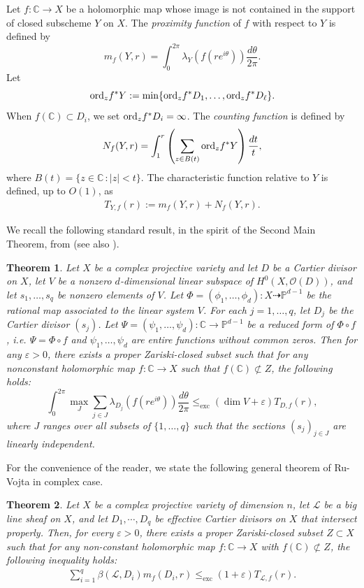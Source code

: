 \documentclass[10pt]{amsart}
\numberwithin{equation}{section}
\theoremstyle{plain}
\newtheorem{theorem}{Theorem}[section]
\theoremstyle{definition}
\begin{document}
Let $f:\mathbb{C}\to X$ be a holomorphic map whose image is not contained in the support of closed subscheme  $Y$ on $X$. 
 The {\it proximity function} of $f$ with respect to $Y$ is defined by $$m_f(Y,r)=\int_0^{2\pi}\lambda_Y(f (re^{i\theta}))\frac{d\theta}{2\pi}.$$
 Let 
$$
{\rm ord}_zf^*Y:=\min\{{\rm ord}_zf^*D_1,\hdots,{\rm ord}_zf^*D_{\ell}\}.
$$
When $f(\mathbb{C})\subset D_i$, we set ${\rm ord}_zf^*D_{i}=\infty$.
The  {\it counting function}   is defined  by
$$
N_f(Y,r) = \int_1^r \left(\sum_{z\in B(t)}{\rm ord}_zf^*Y \right) \frac{dt}{t},
$$
where $B(t)=\{z\in \mathbb C\, : |z|<t\}.$   
 The characteristic function relative to $Y$ is defined, up to $O(1)$, as 
\begin{align}\label{FMT}
T_{Y,f}(r):=m_f(Y,r)+N_f(Y,r).
\end{align}

 
 


We recall the following standard result, in the spirit of the Second Main Theorem, from \cite[Theorem 7.3]{RTW21} (see also \cite[Theorem A.7.1.1]{Rubook}).
\begin{theorem}
\label{gsmt2}
    Let $X$ be a complex projective variety and let $D$ be a Cartier divisor on $X$, let $V$ be a nonzero $d$-dimensional linear subspace of $H^0(X,\mathcal{O}(D))$, and let $s_1,\dots,s_q$ be nonzero elements of $V$. 
 Let $\Phi=(\phi_1,\hdots,\phi_{d}):X\dashrightarrow \mathbb{P}^{d-1}$ be the rational map associated to the linear system $V$. For each $j=1,\dots,q$, let $D_j$ be the Cartier divisor $(s_j)$. 
     Let $\Psi=(\psi_1,\hdots,\psi_{d}):\mathbb C\to   \mathbb{P}^{d-1}$ be a reduced form of $\Phi\circ f$, i.e.  $\Psi=\Phi\circ f$  and $\psi_1,\hdots,\psi_{d}$ are entire functions without common zeros. %
    Then for any $\varepsilon>0$, there exists a proper  Zariski-closed subset such that for any nonconstant holomorphic map $f:\mathbb{C}\to X$ such that  $f(\mathbb{C})\not\subset Z$, the following holds:
       $$\int_0^{2\pi} \max_J \sum_{j\in J} \lambda_{D_j}(f(re^{i\theta}))\frac{d\theta}{2\pi} \leq_{\operatorname{exc}} (\operatorname{dim}V+\varepsilon)T_{D,f}(r),$$ where $J$ ranges over all subsets of $\{1,\dots,q\}$ such that the sections $(s_j)_{j\in J}$ are linearly independent.
       \end{theorem}

For the convenience of the reader, we state the following general theorem of Ru-Vojta in complex case.
\begin{theorem}\label{generalRV}
 Let $X$ be a complex projective variety of dimension $n$,  let $\mathscr L$ be a big line sheaf on $X$, and let
 $D_1,\cdots,D_q$  be effective Cartier divisors on  $X$ that intersect properly.
 Then, for every $\varepsilon>0$,  there exists a proper  Zariski-closed subset $Z\subset X$ such that for any non-constant holomorphic map $f:\mathbb{C}\to X$ with  $f(\mathbb{C})\not\subset Z$,  the following  inequality  holds:
\begin{align}\label{mainineqRV}
 \sum_{i=1}^q \beta(\mathscr L, D_i)m_f(D_i,r)
 \leq_{\operatorname{exc}} (1+\varepsilon)T_{\mathscr L,f}(r).
  \end{align}
\end{theorem}
\end{document}
